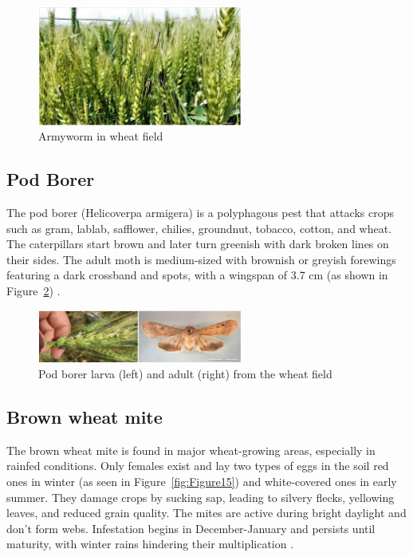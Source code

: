 \begin{figure}[H]
    \centering
    \includegraphics[width=0.6\textwidth]{chapters/chapter2/images/Figure13.png}
    \caption{Armyworm in wheat field \protect\parencite{farook2019insect}}
    \label{fig:Figure13}
\end{figure}

\subsection{Pod Borer}
The pod borer (Helicoverpa armigera) is a polyphagous pest that attacks crops such as gram, lablab, safflower, chilies, groundnut, tobacco, cotton, and wheat. The caterpillars start brown and later turn greenish with dark broken lines on their sides. The adult moth is medium-sized with brownish or greyish forewings featuring a dark crossband and spots, with a wingspan of 3.7 cm (as shown in Figure~\ref{fig:Figure14}) \parencite{farook2019insect}.

\begin{figure}[H]
    \centering
    \includegraphics[width=0.6\textwidth]{chapters/chapter2/images/Figure14.png}
    \caption{Pod borer larva (left) and adult (right) from the wheat field \protect\parencite{farook2019insect}}
    \label{fig:Figure14}
\end{figure}

\subsection{Brown wheat mite}  
The brown wheat mite is found in major wheat-growing areas, especially in rainfed conditions. Only females exist and lay two types of eggs in the soil red ones in winter (as seen in Figure~\ref{fig:Figure15}) and white-covered ones in early summer. They damage crops by sucking sap, leading to silvery flecks, yellowing leaves, and reduced grain quality. The mites are active during bright daylight and don’t form webs. Infestation begins in December-January and persists until maturity, with winter rains hindering their multiplication \parencite{kashyap2018identification}.

